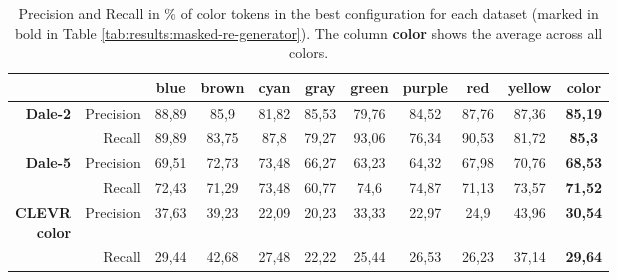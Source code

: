 \begin{table}[ht]
    \centering
    \begin{tabular}{rr|cccccccc|c}
        \toprule
                                         &             & {blue}  & {brown} & {cyan}  & {gray}  & {green} & {purple} & {red}   & {yellow} & \textbf{color} \\\midrule
        \multirow{2}{*}{\textbf{Dale-2}} & {Precision} & {88,89} & {85,9}  & {81,82} & {85,53} & {79,76} & {84,52}  & {87,76} & {87,36}  & \textbf{85,19} \\
                                         & {Recall}    & {89,89} & {83,75} & {87,8}  & {79,27} & {93,06} & {76,34}  & {90,53} & {81,72}  & \textbf{85,3}  \\\midrule
        \multirow{2}{*}{\textbf{Dale-5}} & {Precision} & {69,51} & {72,73} & {73,48} & {66,27} & {63,23} & {64,32}  & {67,98} & {70,76}  & \textbf{68,53} \\
                                         & {Recall}    & {72,43} & {71,29} & {73,48} & {60,77} & {74,6}  & {74,87}  & {71,13} & {73,57}  & \textbf{71,52} \\\midrule
        \multirowcell{2}[0pt][r]{\textbf{CLEVR}                                                                                                           \\\textbf{color}} & {Precision}           & {37,63} & {39,23} & {22,09} & {20,23} & {33,33} & {22,97} & {24,9} & {43,96} & \textbf{30,54} \\
                                         & {Recall}    & {29,44} & {42,68} & {27,48} & {22,22} & {25,44} & {26,53}  & {26,23} & {37,14}  & \textbf{29,64} \\
        \bottomrule
    \end{tabular}
    \caption{Precision and Recall in \% of color tokens in the best configuration for each dataset (marked in bold in Table \ref{tab:results:masked-re-generator}). The column \textbf{color} shows the average across all colors.}
    \label{tab:results:masked-re-generator_color}
\end{table}



